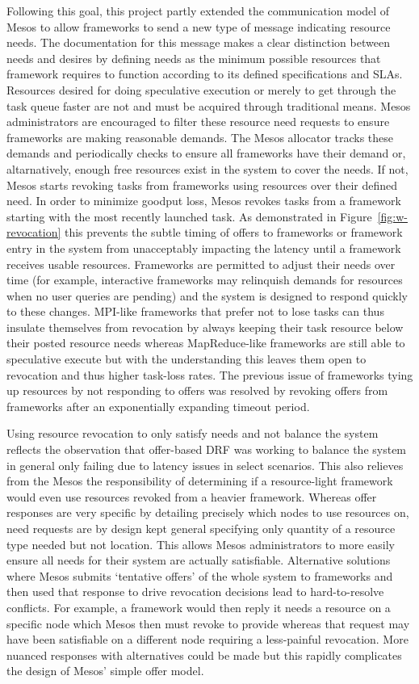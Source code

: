 Following this goal, this project partly extended the communication model of Mesos to allow
frameworks to send a new type of message indicating resource needs. The documentation for this
message makes a clear distinction between needs and desires by defining needs as the minimum
possible resources that framework requires to function according to its defined specifications
and SLAs. Resources desired for doing speculative execution or merely to get through the task
queue faster are not and must be acquired through traditional means. Mesos administrators are
encouraged to filter these resource need requests to ensure frameworks are making reasonable
demands. The Mesos allocator tracks these demands and periodically checks to ensure all
frameworks have their demand or, altarnatively, enough free resources exist in the system to
cover the needs. If not, Mesos starts revoking tasks from frameworks using resources over their
defined need. In order to minimize goodput loss, Mesos revokes tasks from a framework starting
with the most recently launched task. As demonstrated in Figure~\ref{fig:w-revocation} this
prevents the subtle timing of offers to frameworks or framework entry in the system from
unacceptably impacting the latency until a framework receives usable resources. Frameworks are
permitted to adjust their needs over time (for example, interactive frameworks may relinquish
demands for resources when no user queries are pending) and the system is designed to respond
quickly to these changes. MPI-like frameworks that prefer not to lose tasks can thus insulate
themselves from revocation by always keeping their task resource below their posted resource
needs whereas MapReduce-like frameworks are still able to speculative execute but with the
understanding this leaves them open to revocation and thus higher task-loss rates. The previous
issue of frameworks tying up resources by not responding to offers was resolved by revoking
offers from frameworks after an exponentially expanding timeout period.

Using resource revocation to only satisfy needs and not balance the system reflects the
observation that offer-based DRF was working to balance the system in general only failing due
to latency issues in select scenarios. This also relieves from the Mesos the responsibility of
determining if a resource-light framework would even use resources revoked from a heavier
framework. Whereas offer responses are very specific by detailing precisely which nodes to use
resources on, need requests are by design kept general specifying only quantity of a resource
type needed but not location. This allows Mesos administrators to more easily ensure all needs
for their system are actually satisfiable. Alternative solutions where Mesos submits `tentative
offers' of the whole system to frameworks and then used that response to drive revocation
decisions lead to hard-to-resolve conflicts. For example, a framework would then reply it needs
a resource on a specific node which Mesos then must revoke to provide whereas that request may
have been satisfiable on a different node requiring a less-painful revocation. More nuanced
responses with alternatives could be made but this rapidly complicates the design of Mesos'
simple offer model.


